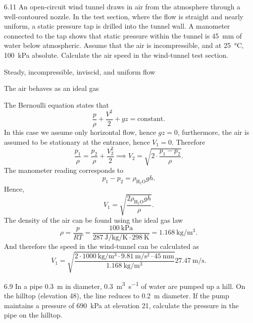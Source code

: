
\begin{problem}{6.11}
  An open-circuit wind tunnel draws in air from the atmosphere through a well-contoured nozzle.  In the test section, where the flow is straight and nearly uniform, a static pressure tap is drilled into the tunnel wall.
  A manometer connected to the tap shows that static pressure within the tunnel is \qty{45}{\mm} of water below atmospheric.
  Assume that the air is incompressible, and at \qty{25}{\celsius}, \qty{100}{\kPa} absolute.
  Calculate the air speed in the wind-tunnel test section.
\end{problem}

\begin{assumptions}
  \item Steady, incompressible, inviscid, and uniform flow
  \item The air behaves as an ideal gas
\end{assumptions}

\begin{derivation}
  The Bernoulli equation states that
  \[ 
  \frac{p}{\rho} + \frac{V^2}{2} + gz = \mathrm{constant}
  .\]
  In this case we assume only horizontal flow, hence $gz = 0$, furthermore, the air is assumed to be stationary at the entrance, hence $V_1 = 0$. 
  Therefore
  \[ 
  \frac{p_1}{\rho} = \frac{p_2}{\rho} + \frac{V_2^2}{2} \implies V_2 = \sqrt{2 \cdot \frac{p_1 - p_2}{\rho}}
  .\]
  The manometer reading corresponds to
  \[ 
  p_1 - p_2 = \rho_{\mathrm{H}_2 \mathrm{O}} gh
  .\]
  Hence,
  \[ 
  V_1 = \sqrt{\frac{2 \rho_{\mathrm{H_2 \mathrm{O}}} gh}{\rho}}
  .\]
  The density of the air can be found using the ideal gas law
  \[ 
  \rho = \frac{p}{RT} = \frac{\qty{100}{\kPa}}{\qty{287}{\joule\per\kg\per\K} \cdot \qty{298}{\K} } = \qty{1,168}{\kg\per\cubic\m} 
  .\]
  And therefore the speed in the wind-tunnel can be calculated as
  \[ 
  V_1 = \sqrt{\frac{2 \cdot \qty{1000}{\kg\per\cubic\m} \cdot \qty{9,81}{\m\per\square\s} \cdot \qty{45}{\mm} }{\qty{1,168}{\kg\per\cubic\meter} }} \qty{27,47}{\m\per\s} 
  .\]
  
\end{derivation}


\begin{problem}{6.9}
  In a pipe \qty{0,3}{\m} in diameter, \qty{0,3}{\cubic\meter\per\s} of water are pumped up a hill.
  On the hilltop (elevation \num{48}), the line reduces to \qty{0,2}{\m} diameter.
  If the pump maintains a pressure of \qty{690}{kPa} at elevation \num{21}, calculate the pressure in the pipe on the hilltop.
\end{problem}

